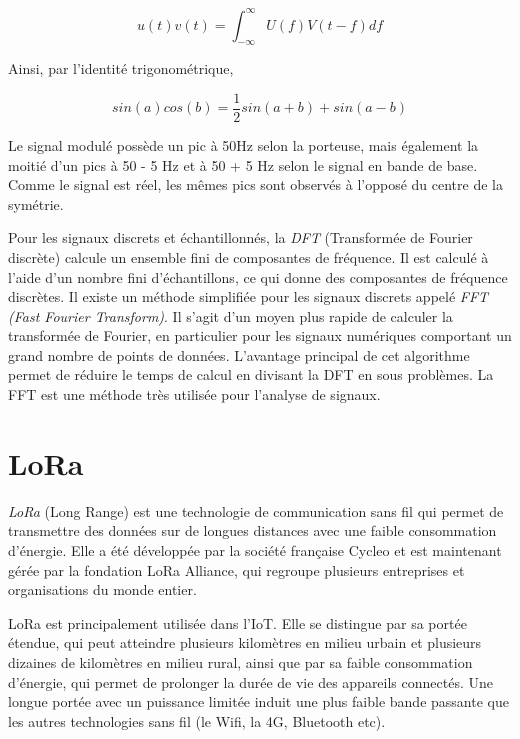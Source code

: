 \begin{equation}
u(t)v(t) = \int_{-\infty}^{\infty} U(f)V(t - f) df
\end{equation}

Ainsi, par l'identité trigonométrique, 

\begin{equation}
sin(a)cos(b) = \frac{1}{2} sin(a+b) + sin(a-b)
\end{equation}

Le signal modulé possède un pic à 50Hz selon la porteuse, mais également la moitié d'un pics à 50 - 5 Hz et à 50 + 5 Hz selon le signal en bande de base. Comme le signal est réel, les mêmes pics sont observés à l'opposé du centre de la symétrie.

\vspace{0.1cm}

Pour les signaux discrets et échantillonnés, la \textit{DFT} (Transformée de Fourier discrète) calcule un ensemble fini de composantes de fréquence. Il est calculé à l’aide d’un nombre fini d’échantillons, ce qui donne des composantes de fréquence discrètes. Il existe un méthode simplifiée pour les signaux discrets appelé \textit{FFT (Fast Fourier Transform)}\cite{fft}. Il s'agit d'un moyen plus rapide de calculer la transformée de Fourier, en particulier pour les signaux numériques comportant un grand nombre de points de données. L'avantage principal de cet algorithme permet de réduire le temps de calcul en divisant la DFT en sous problèmes. La FFT est une méthode très utilisée pour l'analyse de signaux.

\section{LoRa}

\textit{LoRa} (Long Range) est une technologie de communication sans fil qui permet de transmettre des données sur de longues distances avec une faible consommation d'énergie. Elle a été développée par la société française Cycleo et est maintenant gérée par la fondation LoRa Alliance, qui regroupe plusieurs entreprises et organisations du monde entier.

\vspace{0.1cm}

LoRa est principalement utilisée dans l'IoT. Elle se distingue par sa portée étendue, qui peut atteindre plusieurs kilomètres en milieu urbain et plusieurs dizaines de kilomètres en milieu rural, ainsi que par sa faible consommation d'énergie, qui permet de prolonger la durée de vie des appareils connectés. Une longue portée avec un puissance limitée induit une plus faible bande passante que les autres technologies sans fil (le Wifi, la 4G, Bluetooth etc).

